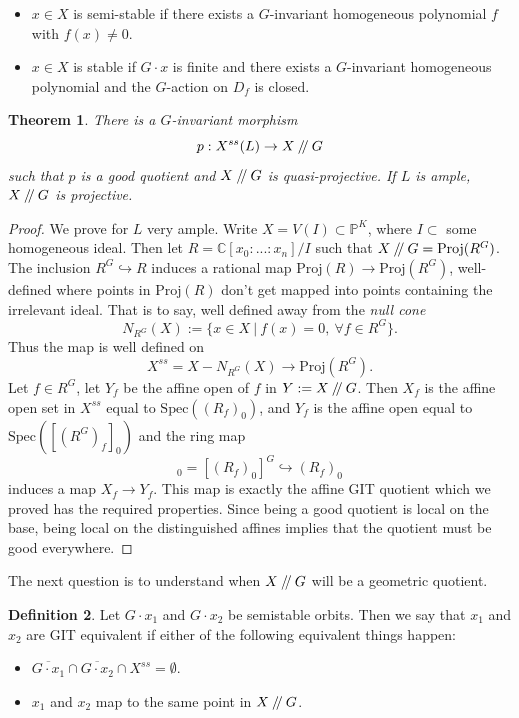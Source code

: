 \documentclass{article}
\newtheorem{theorem}{Theorem}
\theoremstyle{definition}
\newtheorem{definition}[theorem]{Definition}
\theoremstyle{remark}
\numberwithin{theorem}{section}
\newcommand{\C}{\mathbb{C}}
\newcommand{\bP}{\mathbb{P}}
\newcommand{\sslash}{\mathbin{/\mkern-4mu/}}
\newcommand{\Spec}{\text{Spec}}
\newcommand{\Proj}{\text{Proj}}
\newenvironment{thm}{
\begin{mdframed}
	\vspace{-0.5em}
	\begin{theorem}
}{
	\end{theorem}
\end{mdframed}
}
\newenvironment{defn}{
	\begin{mdframed}
		\vspace{-0.5em}
		\begin{definition}
		}{
		\end{definition}
	\end{mdframed}
}
\begin{document}
	\begin{itemize}
		\item $x \in X$ is semi-stable if there exists a $G$-invariant homogeneous polynomial $f$ with $f(x)\neq0$.
		\item $x\in X$ is stable if $G\cdot x$ is finite and there exists a $G$-invariant homogeneous polynomial and the $G$-action on $D_f$ is closed.
	\end{itemize}
	
	\begin{thm}
		There is a $G$-invariant morphism $$p:X^{ss}(L)\to X\sslash G$$ such that $p$ is a good quotient and $X\sslash G$ is quasi-projective. If $L$ is ample, $X\sslash G$ is projective.
	\end{thm}
	\begin{proof}
		We prove for $L$ very ample. Write $X=V(I)\subset\bP^K$, where $I\subset$ some homogeneous ideal. Then let $R=\C[x_0:...:x_n]/I$ such that $X\sslash G = \Proj(R^G)$. The inclusion $R^G\hookrightarrow R$ induces a rational map $\Proj(R)\to \Proj(R^G)$, well-defined where points in $\Proj(R)$ don't get mapped into points containing the irrelevant ideal. That is to say, well defined away from the \emph{null cone}
		\begin{equation}
			N_{R^G}(X):=\{x\in X ~|~ f(x)=0, ~\forall f\in R^G\}.
		\end{equation}
		Thus the map is well defined on
		\begin{equation*}
			X^{ss} = X-N_{R^G}(X)\to \Proj(R^G).
		\end{equation*}
		Let $f\in R^G$, let $Y_f$ be the affine open of $f$ in $Y:=X\sslash G$. Then $X_f$ is the affine open set in $X^{ss}$ equal to $\Spec((R_f)_0)$, and $Y_f$ is the affine open equal to $\Spec([(R^G)_f]_0)$ and the ring map
		\begin{equation*}
			[(R^G)_f]_0 = [(R_f)_0]^G \hookrightarrow (R_f)_0
		\end{equation*}
		induces a map $X_f\to Y_f$. This map is exactly the affine GIT quotient which we proved has the required properties. Since being a good quotient is local on the base, being local on the distinguished affines implies that the quotient must be good everywhere. 
	\end{proof}

	The next question is to understand when $X\sslash G$ will be a geometric quotient.
	\begin{defn}
		Let $G\cdot x_1$ and $G\cdot x_2$ be semistable orbits. Then we say that $x_1$ and $x_2$ are GIT equivalent if either of the following equivalent things happen:
		\begin{itemize}
			\item $\overline{G\cdot x_1}\cap\overline{G\cdot x_2}\cap X^{ss} = \emptyset$.
			\item $x_1$ and $x_2$ map to the same point in $X\sslash G$.
		\end{itemize}
	\end{defn}
\end{document}
